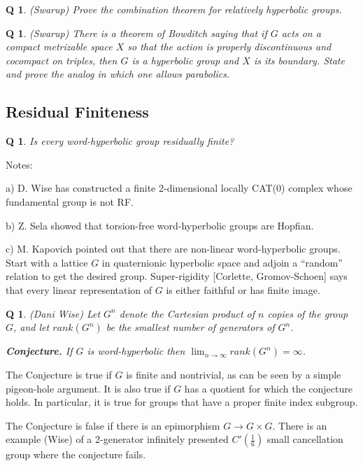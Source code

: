 \documentclass[11pt]{article}
\newtheorem{q}[thm]{Q}
\theoremstyle{remark}
\def\b{\begin{q}}
\def\e{\end{q}}
\newcommand{\<}{\langle}
\renewcommand{\>}{\rangle}
\begin{document}
\begin{q}
(Swarup) Prove the combination theorem for relatively hyperbolic
groups.
\end{q}



\b
(Swarup) There is a theorem of Bowditch saying that if $G$
acts on a compact metrizable space $X$ so that the action is 
properly discontinuous and cocompact on triples, then $G$ is a hyperbolic
group and $X$ is its boundary. State and prove the analog in which one
allows parabolics.
\e









\subsection{Residual Finiteness}

\b
Is every word-hyperbolic group residually finite?
\e

\noindent Notes: 

a) D. Wise has constructed a finite 2-dimensional locally CAT(0) complex
whose fundamental group is not RF.

b) Z. Sela showed that torsion-free word-hyperbolic groups are Hopfian.

c) M. Kapovich pointed out that there are non-linear word-hyperbolic
groups.  Start with a lattice $G$ in quaternionic hyperbolic space and
adjoin a ``random'' relation to get the desired group. Super-rigidity
[Corlette, Gromov-Schoen]
says that every linear representation of $G$ is either faithful or has
finite image.

\b
(Dani Wise)
{\rm Let $G^n$ denote the Cartesian product of $n$ copies of the 
group $G$, and let $rank(G^n)$ be the smallest number of generators of $G^n$.} 

\noindent
{\bf Conjecture.} If $G$ is word-hyperbolic then
$\lim_{n\to\infty}rank(G^n)=\infty$.\e

The Conjecture is true if $G$ is finite and nontrivial, as can be seen by a
simple pigeon-hole argument. It is also true if $G$ has a quotient for which
the conjecture holds. In particular, it is true for groups that have a
proper finite index subgroup. 

The Conjecture is false if there is an epimorphism $G\to G\times G$. There is
an example (Wise) of a 2-generator infinitely presented $C'(\frac{1}{6})$
small cancellation group where the conjecture fails.
\end{document}
